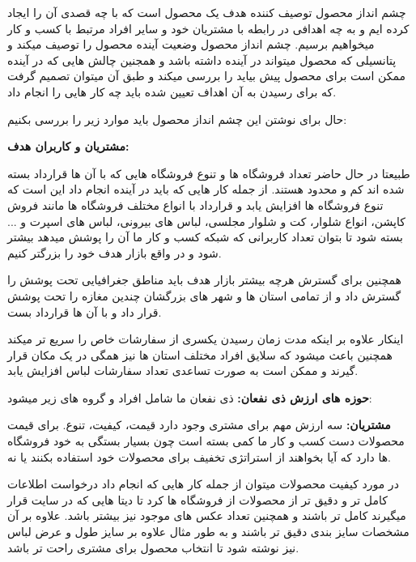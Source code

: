 \documentclass[12pt,a4paper]{article}
\begin{document}
 
\maketitle
\pagebreak
\normalsize	
{\large\textbf{}}


چشم انداز محصول توصیف کننده هدف یک محصول است که با چه قصدی آن را ایجاد کرده ایم و به چه اهدافی در رابطه با مشتریان خود و سایر افراد مرتبط با کسب و کار میخواهیم برسیم. چشم انداز محصول وضعیت آینده محصول را توصیف میکند و پتانسیلی که محصول میتواند در آینده داشته باشد و همجنین چالش هایی که در آینده ممکن است برای محصول پیش بیاید را بررسی میکند و طبق آن میتوان تصمیم گرفت که برای رسیدن به آن اهداف تعیین شده باید چه کار هایی را انجام داد.	
	
	
حال برای نوشتن این چشم انداز محصول باید موارد زیر را بررسی بکنیم:

	
\textbf{مشتریان و کاربران هدف:}


طبیعتا در حال حاضر تعداد فروشگاه ها و تنوع فروشگاه هایی که با آن ها قرارداد بسته شده اند کم و محدود هستند. از جمله کار هایی که باید در آینده انجام داد این است که تنوع فروشگاه ها افزایش یابد و قرارداد با انواع مختلف فروشگاه ها مانند فروش کاپشن، انواع شلوار، کت و شلوار مجلسی، لباس های بیرونی، لباس های اسپرت و ... بسته شود تا بتوان تعداد کاربرانی که شبکه کسب و کار ما آن را پوشش میدهد بیشتر شود و در واقع بازار هدف خود را بزرگتر کنیم.


همچنین برای گسترش هرچه بیشتر بازار هدف باید مناطق جغرافیایی تحت پوشش را گسترش داد و از تمامی استان ها و شهر های بزرگشان چندین مغازه را تحت پوشش قرار داد و با آن ها قرارداد بست.


اینکار علاوه بر اینکه مدت زمان رسیدن یکسری از سفارشات خاص را سریع تر میکند همچنین باعث میشود که سلایق افراد مختلف استان ها نیز همگی در یک مکان قرار گیرند و ممکن است به صورت تساعدی تعداد سفارشات لباس افزایش یابد.


\textbf{حوزه های ارزش ذی نفعان:}
	ذی نفعان ما شامل افراد و گروه های زیر میشود:
	
	
	\textbf{مشتریان: }
	سه ارزش مهم برای مشتری وجود دارد قیمت، کیفیت، تنوع. برای قیمت محصولات دست کسب و کار ما کمی بسته است چون بسیار بستگی به خود فروشگاه ها دارد که آیا بخواهند از استراتژی تخفیف برای محصولات خود استفاده بکنند یا نه.
	
	
	در مورد کیفیت محصولات میتوان از جمله کار هایی که انجام داد درخواست اطلاعات کامل تر و دقیق تر از محصولات از فروشگاه ها کرد تا دیتا هایی که در سایت قرار میگیرند کامل تر باشند و همچنین تعداد عکس های موجود نیز بیشتر باشد. علاوه بر آن مشخصات سایز بندی دقیق تر باشند و به طور مثال علاوه بر سایز طول و عرض لباس نیز نوشته شود تا انتخاب محصول برای مشتری راحت تر باشد.
	
\end{document}

